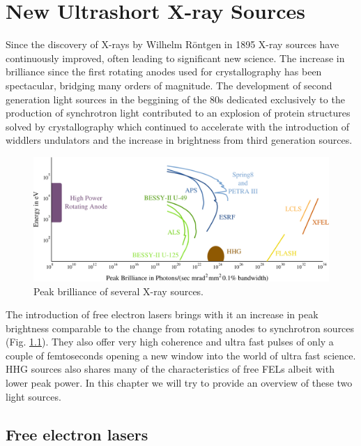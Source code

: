 \chapter{New Ultrashort X-ray Sources}\label{Ultrashort X-ray Sources}\noindent
 
Since the discovery of X-rays by Wilhelm R\"{o}ntgen in 1895 X-ray sources have
continuously improved, often leading to significant new science. The increase in
brilliance since the first rotating anodes used for crystallography has been
spectacular, bridging many orders of magnitude. The development of second
generation light sources in the beggining of the 80s dedicated exclusively to
the production of synchrotron light contributed to an explosion of
protein structures solved by crystallography which continued to accelerate with
the introduction of widdlers undulators and the increase in brightness from
third generation sources.

 
\begin{figure}[h]
\centering
  \includegraphics[width=1.0 \columnwidth]{brilliance.png}
  \caption{Peak brilliance of several X-ray sources.}
  \label{Fig:Brilliance}
\end{figure}

The introduction of free electron lasers brings with it an increase in peak
brightness comparable to the change from rotating anodes to synchrotron sources
(Fig. \ref{Fig:Brilliance}). They also offer very high coherence and ultra fast
pulses of only a couple of femtoseconds opening a new window into the world of
ultra fast science. HHG sources also shares many of the characteristics of free
FELs albeit with lower peak power. In this chapter we will try to provide an
overview of these two light sources.

\section{Free electron lasers}

